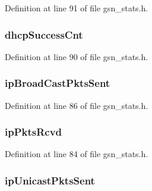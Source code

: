 Definition at line 91 of file gsn\_\-stats.h.

\hypertarget{a00176_a871dafda0f530184fb2d80cca23222f3}{
\subsubsection[{dhcpSuccessCnt}]{ {\bf dhcpSuccessCnt}}}
\label{a00176_a871dafda0f530184fb2d80cca23222f3}


Definition at line 90 of file gsn\_\-stats.h.

\hypertarget{a00176_aa1a3da8bb506ae4eea4ac1ed43c8000a}{
\subsubsection[{ipBroadCastPktsSent}]{ {\bf ipBroadCastPktsSent}}}
\label{a00176_aa1a3da8bb506ae4eea4ac1ed43c8000a}


Definition at line 86 of file gsn\_\-stats.h.

\hypertarget{a00176_ab0853f11aafbd4a050f502595dfe531d}{
\subsubsection[{ipPktsRcvd}]{ {\bf ipPktsRcvd}}}
\label{a00176_ab0853f11aafbd4a050f502595dfe531d}


Definition at line 84 of file gsn\_\-stats.h.

\hypertarget{a00176_aeb59035f4e2e10f2d2cc60150b27d790}{
\subsubsection[{ipUnicastPktsSent}]{ {\bf ipUnicastPktsSent}}}
\label{a00176_aeb59035f4e2e10f2d2cc60150b27d790}



